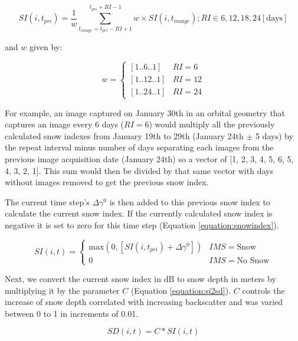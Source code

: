 \documentclass[journal abbreviation, manuscript]{copernicus}
\begin{document}
\begin{equation} \label{equation:previousSI}
    SI (i, t_{pri}) = \frac{1}{w} \sum^{t_{pri} + RI - 1 }_{t_{image} = t_{pri} - RI + 1} w \times SI(i, t_{image}) ; RI \in 6, 12, 18, 24 [\text{days}]
\end{equation}

and $w$ given by:

\begin{equation}\label{equation:previousweights}
    w = \begin{cases} 
      [1..6..1]  & RI = 6 \\
      [1..12..1]  & RI = 12 \\
      [1..24..1]  & RI = 24
   \end{cases}
\end{equation}

For example, an image captured on January 30th in an orbital geometry that captures an image every 6 days ($RI = 6$) would multiply all the previously calculated snow indexes from January 19th to 29th (January 24th $\pm$ 5 days) by the repeat interval minus number of days separating each images from the previous image acquisition date (January 24th) so a vector of [1, 2, 3, 4, 5, 6, 5, 4, 3, 2, 1]. This sum would then be divided by that same vector with days without images removed to get the previous snow index.

The current time step’s $\Delta \gamma^0$ is then added to this previous snow index to calculate the current snow index. If the currently calculated snow index is negative it is set to zero for this time step (Equation \ref{equation:snowindex}).

\begin{equation} \label{equation:snowindex}
    SI (i, t) =  \begin{cases} 
      \text{max}(0, [SI(i, t_{pri}) + \Delta \gamma^0])  & IMS = \text{Snow} \\
      0  & IMS = \text{No Snow}
   \end{cases}
\end{equation}

Next, we convert the current snow index in dB to snow depth in meters by multiplying it by the parameter $C$ (Equation \ref{equation:si2sd}). $C$ controls the increase of snow depth correlated with increasing backscatter and was varied between 0 to 1 in increments of 0.01.

\begin{equation} \label{equation:si2sd}
    SD (i, t) = C * SI (i, t)
\end{equation}
\end{document}
